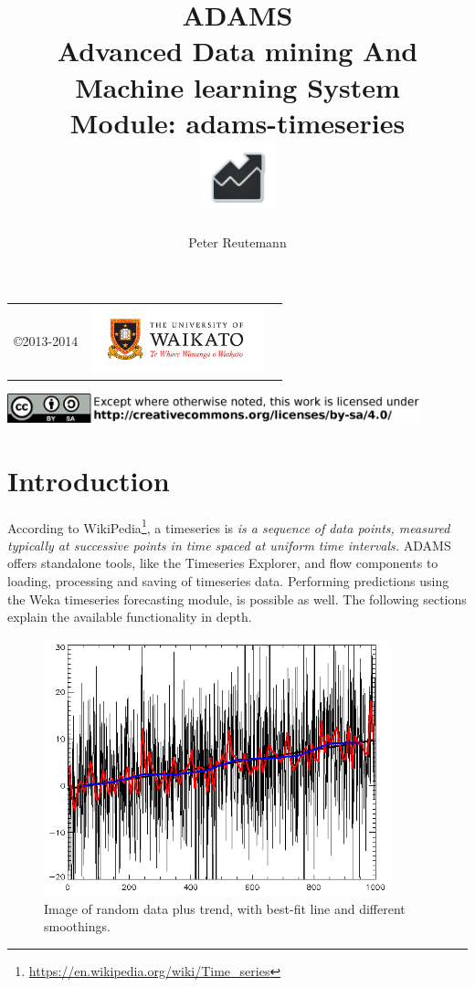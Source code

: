 \documentclass[a4paper]{book}
\title{
  \textbf{ADAMS} \\
  {\Large \textbf{A}dvanced \textbf{D}ata mining \textbf{A}nd \textbf{M}achine
  learning \textbf{S}ystem} \\
  {\Large Module: adams-timeseries} \\
  \vspace{1cm}
  \includegraphics[width=2cm]{images/timeseries-module.png} \\
}
\author{
  Peter Reutemann
}
\begin{document}
\begin{titlepage}
\maketitle

\thispagestyle{empty}
\center
\begin{table}[b]
	\begin{tabular}{c l l}
		\parbox[c][2cm]{2cm}{\copyright 2013-2014} &
		\parbox[c][2cm]{5cm}{\includegraphics[width=5cm]{images/coat_of_arms.pdf}} \\
	\end{tabular}
	\includegraphics[width=12cm]{images/cc.png} \\
\end{table}

\end{titlepage}

\tableofcontents
\listoffigures

\chapter{Introduction}
According to WikiPedia\footnote{\url{https://en.wikipedia.org/wiki/Time_series}{}}, 
a timeseries is \textit{is a sequence of data points, measured typically at 
successive points in time spaced at uniform time intervals.} ADAMS offers 
standalone tools, like the Timeseries Explorer, and flow components to loading,
processing and saving of timeseries data. Performing predictions using the 
Weka timeseries forecasting module, is possible as well. The following sections explain 
the available functionality in depth.

\begin{figure}[htb]
  \centering
  \includegraphics[width=10.0cm]{images/Random-data-plus-trend-r2.png}
  \caption{Image of random data plus trend, with best-fit line and different smoothings\cite{randomplot}.}
\end{figure}
\end{document}
